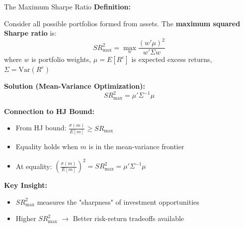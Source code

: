 \documentclass{beamer}
\begin{document}
\begin{frame}{The Maximum Sharpe Ratio}
    \textbf{Definition:}
    
    Consider all possible portfolios formed from assets. The \textbf{maximum squared Sharpe ratio} is:
    \begin{equation}\label{eq:max_sr}
        SR^2_{\max} = \max_w \frac{(w' \mu)^2}{w' \Sigma w}
    \end{equation}
    where $w$ is portfolio weights, $\mu = E[R^e]$ is expected excess returns, $\Sigma = \text{Var}(R^e)$
    
    \vspace{0.3cm}
    \textbf{Solution (Mean-Variance Optimization):}
    \begin{equation*}
        SR^2_{\max} = \mu' \Sigma^{-1} \mu
    \end{equation*}
    
    
    \textbf{Connection to HJ Bound:}
    \begin{itemize}
        \item From HJ bound: $\frac{\sigma(m)}{E[m]} \geq SR_{\max}$
        \item Equality holds when $m$ is in the mean-variance frontier
        \item At equality: $\left(\frac{\sigma(m)}{E[m]}\right)^2 = SR^2_{\max} = \mu' \Sigma^{-1} \mu$
    \end{itemize}
    
    
    \textbf{Key Insight:}
    \begin{itemize}
        \item $SR^2_{\max}$ measures the "sharpness" of investment opportunities
        \item Higher $SR^2_{\max}$ $\rightarrow$ Better risk-return tradeoffs available
    \end{itemize}
\end{frame}
\end{document}

